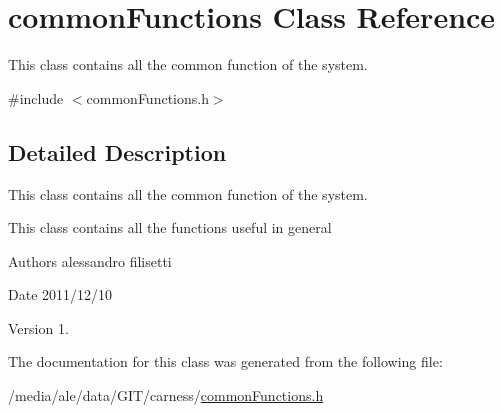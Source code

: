 \hypertarget{a00010}{\section{common\-Functions Class Reference}
\label{a00010}
}


This class contains all the common function of the system.  




{\ttfamily \#include $<$common\-Functions.\-h$>$}



\subsection{Detailed Description}
This class contains all the common function of the system. 

This class contains all the functions useful in general \begin{DoxyAuthor}{Authors}
alessandro filisetti 
\end{DoxyAuthor}
\begin{DoxyDate}{Date}
2011/12/10 
\end{DoxyDate}
\begin{DoxyVersion}{Version}
1. 
\end{DoxyVersion}


The documentation for this class was generated from the following file\-:\begin{DoxyCompactItemize}
\item 
/media/ale/data/\-G\-I\-T/carness/\hyperlink{a00028}{common\-Functions.\-h}\end{DoxyCompactItemize}
